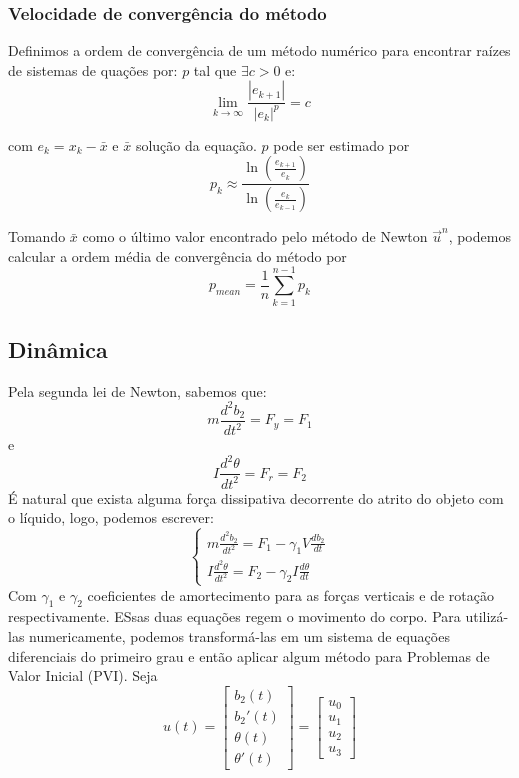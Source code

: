 \documentclass[
	12pt,				%
	oneside,			%
	a4paper,			%
	]{article}
\begin{document}
    \subsubsection{Velocidade de convergência do método}
    Definimos a ordem de convergência de um método numérico para encontrar raízes de sistemas de quações por: $p$ tal que $\exists c > 0$ e:
    \[
        \lim_{k \to \infty} \frac{|e_{k+1}|}{|e_k|^p} = c
    \]

    com $e_k = x_k - \bar{x}$ e $\bar{x}$ solução da equação. $p$ pode ser estimado por 
    \[
        p_k \approx \frac{\ln\left( \frac{e_{k+1}}{e_k} \right)}{\ln\left( \frac{e_k}{e_{k-1}} \right)}
    \]

    Tomando $\bar{x}$ como o último valor encontrado pelo método de Newton $\vec{u}^n$, podemos calcular a ordem média de convergência do método por 
    \[
        p_{mean} = \frac{1}{n}\sum_{k=1}^{n-1} p_k
    \]


    \subsection{Dinâmica}
    \label{sec:din}
    Pela segunda lei de Newton, sabemos que:
    \[
        m \frac{d^2b_2}{dt^2} = F_y = F_1
    \]
    e
    \[
        I \frac{d^2 \theta}{dt^2} = F_r = F_2
    \]
    É natural que exista alguma força dissipativa decorrente do atrito do objeto com o líquido, logo, podemos escrever:
    \begin{equation}
        \begin{cases}
            m \frac{d^2b_2}{dt^2} = F_1 - \gamma_1 V \frac{db_2}{dt} \\
            I \frac{d^2 \theta}{dt^2} = F_2 - \gamma_2 I \frac{d\theta}{dt}
        \end{cases}
    \end{equation}
    Com $\gamma_1$ e $\gamma_2$ coeficientes de amortecimento para as forças verticais e de rotação respectivamente. ESsas duas equações regem o movimento do corpo. Para utilizá-las numericamente, podemos transformá-las em um sistema de equações diferenciais do primeiro grau e então aplicar algum método para Problemas de Valor Inicial (PVI). Seja
    \[
        u(t) = \begin{bmatrix}
            b_2(t) \\
            b_2'(t) \\
            \theta(t) \\
            \theta '(t)
        \end{bmatrix} = \begin{bmatrix}
            u_0 \\ u_1 \\ u_2 \\ u_3
        \end{bmatrix}
    \]
\end{document}
